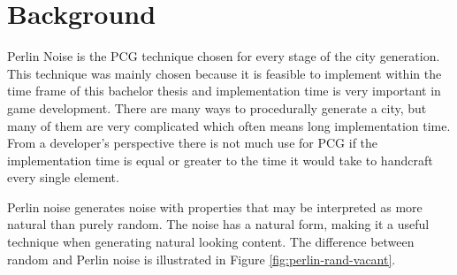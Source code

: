 	\section{Background}
	Perlin Noise is the PCG technique chosen for every stage of the city generation.
	This technique was mainly chosen because it is feasible to implement within the time frame of this bachelor thesis and implementation time is very important in game development.
	There are many ways to procedurally generate a city, but many of them are very complicated which often means long implementation time. From a developer's perspective there is not much use for PCG if the implementation time is equal or greater to the time it would take to handcraft every single element.
	
	Perlin noise generates noise with properties that may be interpreted as more natural than purely random. The noise has a natural form, making it a useful technique when generating natural looking content. The difference between random and Perlin noise is illustrated in Figure \ref{fig:perlin-rand-vacant}.
	
